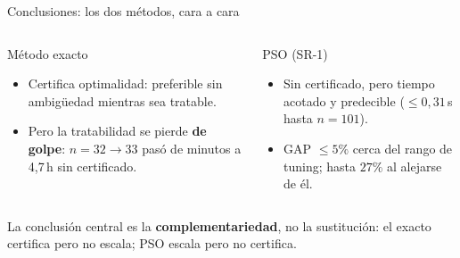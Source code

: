 \documentclass[aspectratio=169, 11pt, xcolor={dvipsnames,table}]{beamer}
\newcommand{\azul}[1]{\textcolor{UsachAzul}{#1}}
\newcommand{\naranja}[1]{\textcolor{UsachNaranja}{#1}}
\begin{document}
\begin{frame}{Conclusiones: los dos métodos, cara a cara}
\vspace{6pt}
\begin{columns}[c]
\begin{block}{Método exacto}
\footnotesize
\begin{itemize}\setlength\itemsep{6pt}
  \item \azul{Certifica optimalidad}: preferible sin ambigüedad mientras sea tratable.
  \item Pero la tratabilidad se pierde \textbf{de golpe}: $n{=}32\to33$ pasó de minutos a 4,7\,h sin certificado.
\end{itemize}
\end{block}
\begin{alertblock}{PSO (SR-1)}
\footnotesize
\begin{itemize}\setlength\itemsep{6pt}
  \item Sin certificado, pero \naranja{tiempo acotado y predecible} ($\le 0{,}31$\,s hasta $n{=}101$).
  \item GAP $\le 5\%$ cerca del rango de tuning; hasta $27\%$ al alejarse de él.
\end{itemize}
\end{alertblock}
\end{columns}
\vspace{14pt}
\begin{ideaclave}
\footnotesize
La conclusión central es la \textbf{complementariedad}, no la sustitución: \azul{el exacto certifica pero no escala; PSO escala pero no certifica.}
\end{ideaclave}
\end{frame}
\end{document}
